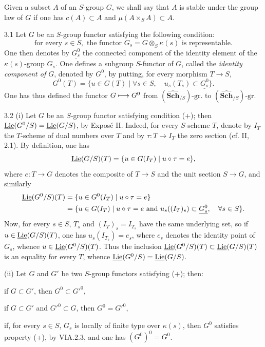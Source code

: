 Given a subset $A$ of an $S$-group $G$, we shall say that $A$ is stable under the group law of $G$ if one has $c(A)\subset A$ and $\mu(A\times_SA)\subset A$.
\begin{definition}{3.1}\label{VIB.3.1}
Let $G$ be an $S$-group functor satisfying the following condition:
\[
\tag{+}
\text{for every }s\in S,\text{ the functor }G_s=G\otimes_S\kappa(s)\text{ is representable.}
\]
One then denotes by $\underline{G_s^0}$ the connected component of the identity element of the $\kappa(s)$-group $G_s$. One defines a subgroup $S$-functor of $G$, called the \emph{identity component of $G$}, denoted by $G^0$, by putting, for every morphism $T\to S$,
\[
G^0(T)=\{u\in G(T)\mid\forall s\in S,\quad u_s(T_s)\subset\underline{G_s^0}\}.
\]
One has thus defined the functor $G\longmapsto G^0$ from $(\widehat{\mathbf{Sch}}_{/S})\text{-gr.}$ to $(\widehat{\mathbf{Sch}}_{/S})\text{-gr.}$
\end{definition}
\begin{remark}{3.2}\label{VIB.3.2}
(i) Let $G$ be an $S$-group functor satisfying condition (+); then $\underline{\operatorname{Lie}}(G^0/S)=\underline{\operatorname{Lie}}(G/S)$, by Exposé II. Indeed, for every $S$-scheme $T$, denote by $I_T$ the $T$-scheme of dual numbers over $T$ and by $\tau:T\to I_T$ the zero section (cf. II, 2.1). By definition, one has
\[
\underline{\operatorname{Lie}}(G/S)(T)=\{u\in G(I_T)\mid u\circ\tau=e\},
\]
where $e:T\to G$ denotes the composite of $T\to S$ and the unit section $S\to G$, and similarly
\[
\begin{aligned}
\underline{\operatorname{Lie}}(G^0/S)(T)&=\{u\in G^0(I_T)\mid u\circ\tau=e\}\\
&=\{u\in G(I_T)\mid u\circ\tau=e\text{ and }u_s((I_T)_s)\subset\underline{G_s^0},\quad\forall s\in S\}.
\end{aligned}
\]
Now, for every $s\in S$, $T_s$ and $(I_T)_s=I_{T_s}$ have the same underlying set, so if $u\in\underline{\operatorname{Lie}}(G/S)(T)$, one has $u_s(I_{T_s})=e_s$, where $e_s$ denotes the identity point of $G_s$, whence $u\in\underline{\operatorname{Lie}}(G^0/S)(T)$. Thus the inclusion $\underline{\operatorname{Lie}}(G^0/S)(T)\subset\underline{\operatorname{Lie}}(G/S)(T)$ is an equality for every $T$, whence $\underline{\operatorname{Lie}}(G^0/S)=\underline{\operatorname{Lie}}(G/S)$.

(ii) Let $G$ and $G'$ be two $S$-group functors satisfying (+); then:
\begin{enumeratea}
\item if $G\subset G'$, then $G^0\subset G'^0$,
\item if $G\subset G'$ and $G'^0\subset G$, then $G^0=G'^0$,
\item if, for every $s\in S$, $G_s$ is locally of finite type over $\kappa(s)$, then $G^0$ satisfies property (+), by VIA.2.3, and one has $(G^0)^0=G^0$.
\end{enumeratea}
\end{remark}
